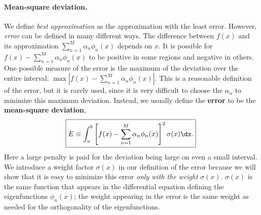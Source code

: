 \paragraph{Mean-square deviation.}
We define \textit{best approximation} as the approximation with the least error.  However, \textit{error} can be defined in many different ways.  The difference between $f(x)$ and its approximation $\sum_{n=1}^M \alpha_n\phi_n(x)$ depends on $x$.  It is possible for $f(x) - \sum_{n=1}^M \alpha_n\phi_n(x)$ to be positive in some regions and negative in others.  One possible measure of the error is the maximum of the deviation over the entire interval: $\max|f(x) - \sum_{n=1}^M \alpha_n\phi_n(x)|$.  This is a reasonable definition of the error, but it is rarely used, since it is very difficult to choose the $\alpha_n$ to minimize this maximum deviation.  Instead, we usually define the \textbf{error} to be the \textbf{mean-square deviation},
\begin{equation}
\label{eq:ap-msd}
\boxed{E \equiv \int_a^b \left[f(x) - \sum_{n=1}^M \alpha_n\phi_n(x)\right]^2 \sigma(x)\dx.}
\end{equation}
Here a large penalty is paid for the deviation being large on even a small interval.  We introduce a weight factor $\sigma(x)$ in our definition of the error because we will show that it is easy to minimize this error \textit{only with the weight} $\sigma(x)$.  $\sigma(x)$ is the same function that appears in the differential equation defining the eigenfunctions $\phi_n(x)$; the weight appearing in the error is the same weight as needed for the orthogonality of the eigenfunctions.

